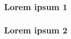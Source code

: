 \begin{frame}
  \frametitle{Lorem ipsum 1}
\end{frame}

\begin{frame}
  \frametitle{Lorem ipsum 2}
\end{frame}
